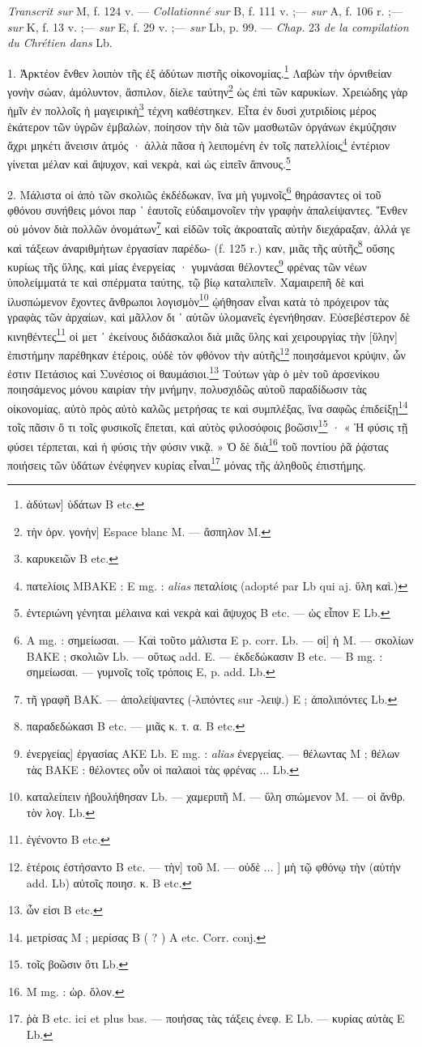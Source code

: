 \documentclass[a4paper, 11pt, oneside, polutonikogreek, french]{article}
\begin{document}
\emph{Transcrit sur} M, f. 124 v. --- \emph{Collationné sur} B, f. 111 v. ;--- \emph{sur} A, f. 106 r. ;--- \emph{sur} K, f. 13 v. ;--- \emph{sur} E, f. 29 v. ;--- \emph{sur} Lb, p. 99. --- \emph{Chap.} 23 \emph{de la compilation du Chrétien dans} Lb.

1. Ἀρκτέον ἔνθεν λοιπὸν τῆς ἐξ ἀδύτων πιστῆς οἰκονομίας.\footnote{ἀδύτων] ὑδάτων B etc.} Λαβὼν τὴν ὀρνιθείαν γονὴν σώαν, ἀμόλυντον, ἄσπιλον, δίελε ταύτην\footnote{τὴν ὀρν. γονὴν] Espace blanc M. --- ἄσπηλον M.} ὡς ἐπὶ τῶν καρυκίων. Χρειώδης γὰρ ἡμῖν ἐν πολλοῖς ἡ μαγειρικὴ\footnote{καρυκειῶν B etc.} τέχνη καθέστηκεν. Εἶτα ἐν δυσὶ χυτριδίοις μέρος ἑκάτερον τῶν ὑγρῶν ἐμβαλὼν, ποίησον τὴν διὰ τῶν μασθωτῶν ὀργάνων ἐκμύζησιν ἄχρι μηκέτι ἄνεισιν ἀτμός · ἀλλὰ πᾶσα ἡ λειπομένη ἐν τοῖς πατελλίοις\footnote{πατελίοις MBAKE : E mg. : \emph{alias} πεταλίοις (adopté par Lb qui aj. ὕλη καὶ.)} ἐντέριον γίνεται μέλαν καὶ ἄψυχον, καὶ νεκρὰ, καὶ ὡς εἰπεῖν ἄπνους.\footnote{ἐντεριώνη γένηται μέλαινα καὶ νεκρὰ καὶ ἄψυχος B etc. --- ὡς εἶπον E Lb.}

2. Μάλιστα οἱ ἀπὸ τῶν σκολιῶς ἐκδέδωκαν, ἵνα μὴ γυμνοῖς\footnote{A mg. : σημείωσαι. --- Kαὶ τοῦτο μάλιστα E p. corr. Lb. --- οἱ] ἡ M. --- σκολίων BAKE ; σκολιῶν Lb. --- οὕτως add. E. --- ἐκδεδώκασιν B etc. --- B mg. : σημείωσαι. --- γυμνοῖς τοῖς τρόποις E, p. add. Lb.} θηράσαντες οἱ τοῦ φθόνου συνήθεις μόνοι παρ ᾽ ἑαυτοῖς εὐδαιμονοῖεν τὴν γραφὴν ἀπαλείψαντες. Ἔνθεν οὐ μόνον διὰ πολλῶν ὀνομάτων\footnote{τῆ γραφῆ BAK. --- ἀπολείψαντες (-λιπόντες sur -λειψ.) E ; ἀπολιπόντες Lb.} καὶ εἰδῶν τοῖς ἀκροαταῖς αὐτὴν διεχάραξαν, ἀλλά γε καὶ τάξεων ἀναριθμήτων ἐργασίαν παρέδω- (f. 125 r.) καν, μιᾶς τῆς αὐτῆς\footnote{παραδεδώκασι B etc. --- μιᾶς κ. τ. α. B etc.} οὔσης κυρίως τῆς ὕλης, καὶ μίας ἐνεργείας · γυμνάσαι θέλοντες\footnote{ἐνεργείας] ἐργασίας AKE Lb. E mg. : \emph{alias} ἐνεργείας. --- θέλωντας M ; θέλων τὰς BAKE : θέλοντες οὖν οἱ παλαιοὶ τὰς φρένας ... Lb.} φρένας τῶν νέων ὑπολείμματά τε καὶ σπέρματα ταύτης, τῷ βίῳ καταλιπεῖν. Χαμαιρεπῆ δὲ καὶ ἰλυσπώμενον ἔχοντες ἄνθρωποι λογισμὸν\footnote{καταλείπειν ἠβουλήθησαν Lb. --- χαμεριπῆ M. --- ὕλη σπώμενον M. --- οἱ ἄνθρ. τὸν λογ. Lb.} ᾠήθησαν εἶναι κατὰ τὸ πρόχειρον τὰς γραφὰς τῶν ἀρχαίων, καὶ μᾶλλον δι ᾽ αὐτῶν ὑλομανεῖς ἐγενήθησαν. Εὐσεβέστερον δὲ κινηθέντες\footnote{ἐγένοντο B etc.} οἱ μετ ᾽ ἐκείνους διδάσκαλοι διὰ μιᾶς ὕλης καὶ χειρουργίας τὴν [ὕλην] ἐπιστήμην παρέθηκαν ἑτέροις, οὐδὲ τὸν φθόνον τὴν αὐτῆς\footnote{ἑτέροις ἐστήσαντο B etc. --- τὴν] τοῦ M. --- οὐδὲ ... ] μὴ τῷ φθόνῳ τὴν (αὐτὴν add. Lb) αὐτοῖς ποιησ. κ. B etc.} ποιησάμενοι κρύψιν, ὧν ἐστιν Πετάσιος καὶ Συνέσιος οἱ θαυμάσιοι.\footnote{ὧν εἰσι B etc.} Τούτων γὰρ ὁ μὲν τοῦ ἀρσενίκου ποιησάμενος μόνου καιρίαν τὴν μνήμην, πολυσχιδῶς αὐτοῦ παραδίδωσιν τὰς οἰκονομίας, αὐτὸ πρὸς αὐτὸ καλῶς μετρήσας τε καὶ συμπλέξας, ἵνα σαφῶς ἐπιδείξῃ\footnote{μετρίσας M ; μερίσας B ( ? ) A etc. Corr. conj.} τοῖς πᾶσιν ὅ τι τοῖς φυσικοῖς ἕπεται, καὶ αὐτὸς φιλοσόφοις βοῶσιν\footnote{τοῖς βοῶσιν ὅτι Lb.} · « Ἡ φύσις τῇ φύσει τέρπεται, καὶ ἡ φύσις τὴν φύσιν νικᾷ. » Ὁ δὲ διὰ\footnote{M mg. : ὡρ. ὅλον.} τοῦ ποντίου ῥᾶ ῥᾴστας ποιήσεις τῶν ὑδάτων ἐνέφηνεν κυρίας εἶναι\footnote{ῥὰ B etc. ici et plus bas. --- ποιήσας τὰς τάξεις ἐνεφ. E Lb. --- κυρίας αὐτὰς E Lb.} μόνας τῆς ἀληθοῦς ἐπιστήμης.
\end{document}
